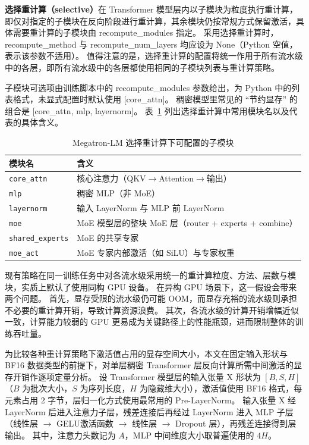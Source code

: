\textbf{选择重计算（selective）}在 Transformer 模型层内以子模块为粒度执行重计算，即仅对指定的子模块在反向阶段进行重计算，其余模块仍按常规方式保留激活，具体需要重计算的子模块由 recompute\_modules 指定。
采用选择重计算时，recompute\_method 与 recompute\_num\_layers 均应设为 None（Python 空值，表示该参数不适用）。
值得注意的是，选择重计算的配置将统一作用于所有流水级中的各层，即所有流水级中的各层都使用相同的子模块列表与重计算策略。

子模块可选项由训练脚本中的 recompute\_modules 参数给出，为 Python 中的列表格式，未显式配置时默认使用 [core\_attn]。
稠密模型里常见的 “节约显存” 的组合是 [core\_attn, mlp, layernorm]。
表~\ref{tab:chap4-megatron-modules} 列出选择重计算中常用模块名以及代表的具体含义。

\begin{table}[htbp]
	\centering
	\caption{Megatron-LM 选择重计算下可配置的子模块}
	\label{tab:chap4-megatron-modules}
	\renewcommand{\arraystretch}{1.4}
	\begin{tabular}{ll}
		\toprule
		\textbf{模块名} & \textbf{含义} \\
		\midrule
		\texttt{core\_attn} & 核心注意力（QKV$\to$Attention$\to$输出） \\
		\hdashline
		\texttt{mlp} & 稠密 MLP（非 MoE） \\
		\hdashline
		\texttt{layernorm} & 输入 LayerNorm 与 MLP 前 LayerNorm \\
		\hdashline
		\texttt{moe} & MoE 模型层的整块 MoE 层（router + experts + combine） \\
		\hdashline
		\texttt{shared\_experts} & MoE 的共享专家 \\
		\hdashline
		\texttt{moe\_act} & MoE 专家内部激活（如 SiLU）与专家权重 \\
		\bottomrule
	\end{tabular}
	\renewcommand{\arraystretch}{1.0}
\end{table}


现有策略在同一训练任务中对各流水级采用统一的重计算粒度、方法、层数与模块，实质上默认了使用同构 GPU 设备。
在异构 GPU 场景下，这一假设会带来两个问题。
首先，显存受限的流水级仍可能 OOM，而显存充裕的流水级则承担不必要的重计算开销，导致计算资源浪费。
其次，各流水级的计算开销增幅近似一致，计算能力较弱的 GPU 更易成为关键路径上的性能瓶颈，进而限制整体的训练吞吐量。

为比较各种重计算策略下激活值占用的显存空间大小，本文在固定输入形状与 BF16 数据类型的前提下，对单层稠密 Transformer 层反向计算所需中间激活的显存开销作逐项定量分析。
设 Transformer 模型层的输入张量 X 形状为 $[B, S, H]$（$B$ 为批次大小，$S$ 为序列长度，$H$ 为隐藏维大小），激活值使用 BF16 格式，每元素占用 2 字节，层归一化方式使用最常用的 Pre-LayerNorm。
输入张量 X 经 LayerNorm 后进入注意力子层，残差连接后再经过 LayerNorm 进入 MLP 子层（线性层 $\to$ GELU激活函数 $\to$ 线性层 $\to$ Dropout 层），再残差连接得到层输出。
其中，注意力头数记为 $A$，MLP 中间维度大小取普遍使用的 $4H$。

